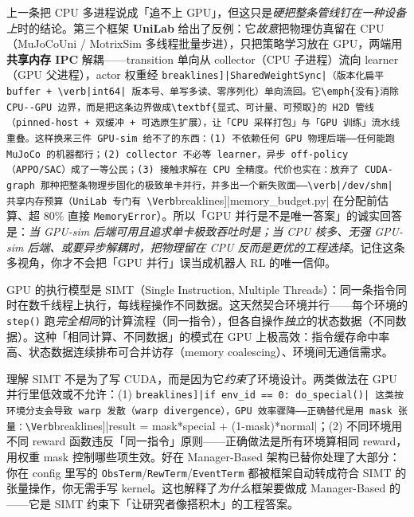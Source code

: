 \begin{insight}\label{ins:rlmc-eco-heterogeneous}
上一条把 CPU 多进程说成「追不上 GPU」，但这只是\emph{硬把整条管线钉在一种设备上}时的结论。第三个框架 \textbf{UniLab} 给出了反例：它\emph{故意}把物理仿真留在 CPU（MuJoCoUni / MotrixSim 多线程批量步进），只把策略学习放在 GPU，两端用\textbf{共享内存 IPC} 解耦——transition 单向从 collector（CPU 子进程）流向 learner（GPU 父进程），actor 权重经 \Verb[breaklines]|SharedWeightSync|（版本化扁平 buffer + \verb|int64| 版本号、单写多读、零序列化）单向流回。它\emph{没有}消除 CPU--GPU 边界，而是把这条边界做成\textbf{显式、可计量、可预取}的 H2D 管线（pinned-host + 双缓冲 + 可选原生扩展），让「CPU 采样打包」与「GPU 训练」流水线重叠。这样换来三件 GPU-sim 给不了的东西：(1) 不依赖任何 GPU 物理后端——任何能跑 MuJoCo 的机器都行；(2) collector 不必等 learner，异步 off-policy（APPO/SAC）成了一等公民；(3) 接触求解在 CPU 全精度。代价也实在：放弃了 CUDA-graph 那种把整条物理步固化的极致单卡并行，并多出一个新失败面——\verb|/dev/shm| 共享内存预算（UniLab 专门有 \Verb[breaklines]|memory_budget.py| 在分配前估算、超 80\% 直接 \verb|MemoryError|）。所以「GPU 并行是不是唯一答案」的诚实回答是：\emph{当 GPU-sim 后端可用且追求单卡极致吞吐时是；当 CPU 核多、无强 GPU-sim 后端、或要异步解耦时，把物理留在 CPU 反而是更优的工程选择}。记住这条多视角，你才不会把「GPU 并行」误当成机器人 RL 的唯一信仰。
\end{insight}

GPU 的执行模型是 SIMT（Single Instruction, Multiple Threads）：同一条指令同时在数千线程上执行，每线程操作不同数据。这天然契合环境并行——每个环境的 \verb|step()| 跑\emph{完全相同}的计算流程（同一指令），但各自操作\emph{独立}的状态数据（不同数据）。这种「相同计算、不同数据」的模式在 GPU 上极高效：指令缓存命中率高、状态数据连续排布可合并访存（memory coalescing）、环境间无通信需求。

\begin{insight}\label{ins:rlmc-eco-simt}
理解 SIMT 不是为了写 CUDA，而是因为它\emph{约束}了环境设计。两类做法在 GPU 并行里低效或不允许：(1) \Verb[breaklines]|if env_id == 0: do_special()| 这类按环境分支会导致 warp 发散（warp divergence），GPU 效率骤降——正确替代是用 mask 张量：\Verb[breaklines]|result = mask*special + (1-mask)*normal|；(2) 不同环境用不同 reward 函数违反「同一指令」原则——正确做法是所有环境算相同 reward，用权重 mask 控制哪些项生效。好在 Manager-Based 架构已替你处理了大部分：你在 config 里写的 \verb|ObsTerm|/\allowbreak\verb|RewTerm|/\allowbreak\verb|EventTerm| 都被框架自动转成符合 SIMT 的张量操作，你无需手写 kernel。这也解释了\emph{为什么}框架要做成 Manager-Based 的——它是 SIMT 约束下「让研究者像搭积木」的工程答案。
\end{insight}


